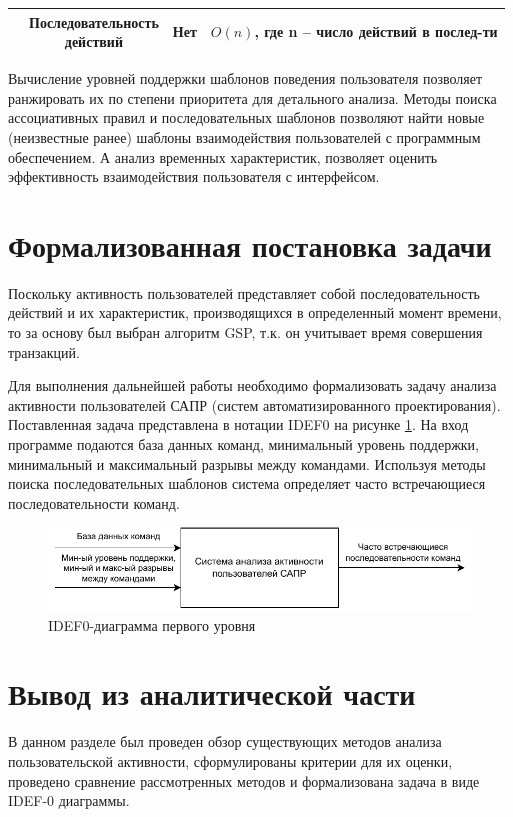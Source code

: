 \begin{table}[H]
\begin{center}
\begin{tabular}{ | c | c | c | c | }
			\specialcell{GOMS} & \specialcell{Последовательность\\действий} & Нет & \specialcell{$O(n)$, где n --\\число действий\\в послед-ти} \\ \hline
		\end{tabular}
	\end{center}
\end{table}

Вычисление уровней поддержки шаблонов поведения пользователя позволяет ранжировать их по степени приоритета для детального анализа.
Методы поиска ассоциативных правил и последовательных шаблонов позволяют найти новые (неизвестные ранее) шаблоны взаимодействия пользователей с программным обеспечением.
А анализ временных характеристик, позволяет оценить эффективность взаимодействия пользователя с интерфейсом.

\section{Формализованная постановка задачи}
Поскольку
активность пользователей представляет собой последовательность действий и их характеристик, производящихся в определенный момент времени, то за основу был выбран алгоритм GSP, т.к. он учитывает время совершения транзакций.

Для выполнения дальнейшей работы необходимо формализовать задачу анализа активности пользователей САПР (систем автоматизированного проектирования). Поставленная задача представлена в нотации IDEF0 на рисунке \ref{idef0}. На вход программе подаются база данных команд, минимальный уровень поддержки, минимальный и максимальный разрывы между командами. Используя методы поиска последовательных шаблонов система определяет часто встречающиеся последовательности команд.

\begin{figure}[h!]
	\centering
	\includegraphics[width=1.0\textwidth]{inc/img/IDEF0.drawio.pdf}
	\caption{IDEF0-диаграмма первого уровня}
	\label{idef0}
\end{figure}

\section*{Вывод из аналитической части}

В данном разделе был проведен обзор существующих методов анализа пользовательской активности, сформулированы критерии для их оценки, проведено сравнение рассмотренных методов и формализована задача в виде IDEF-0 диаграммы.